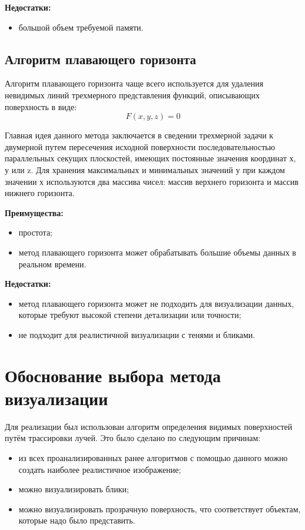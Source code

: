 \textbf{Недостатки:}
\begin{itemize}
	\item большой объем требуемой памяти.
\end{itemize}
\subsection{Алгоритм плавающего горизонта}
Алгоритм плавающего горизонта чаще всего используется для удаления невидимых линий трехмерного представления функций, описывающих поверхность в виде:
\[
F(x, y, z) = 0
\]

Главная идея данного метода заключается в сведении трехмерной задачи к двумерной путем пересечения исходной поверхности последовательностью параллельных секущих плоскостей, имеющих постоянные значения координат х, у или z. Для хранения максимальных и минимальных значений у при каждом значении х используются два массива чисел: массив верхнего горизонта и массив нижнего горизонта.

\textbf{Преимущества:}
\begin{itemize}
	\item простота;
	\item метод плавающего горизонта может обрабатывать большие объемы данных в реальном времени.
\end{itemize}

\textbf{Недостатки:}
\begin{itemize}
	\item метод плавающего горизонта может не подходить для визуализации данных, которые требуют высокой степени детализации или точности;
	\item не подходит для реалистичной визуализации с тенями и бликами.
\end{itemize}

\section{Обоснование выбора метода визуализации}
Для реализации был использован алгоритм определения видимых поверхностей путём трассировки лучей. Это было сделано по следующим причинам:
\begin{itemize}
	\item из всех проанализированных ранее алгоритмов с помощью данного можно создать наиболее реалистичное изображение;
	\item можно визуализировать блики;
	\item можно визуализировать прозрачную поверхность, что соответствует объектам, которые надо было представить.
\end{itemize}
\clearpage
